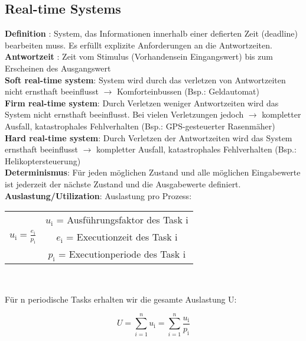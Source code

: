 \subsection{Real-time Systems}
\textbf{Definition} : System, das Informationen innerhalb einer defierten Zeit
(deadline) bearbeiten muss. Es erfüllt explizite Anforderungen an die
Antwortzeiten.\\
\textbf{Antwortzeit} : Zeit vom Stimulus (Vorhandensein
Eingangswert) bis zum Erscheinen des Ausgangswert\\
\textbf{Soft real-time system}: System wird durch das verletzen von
Antwortzeiten nicht ernsthaft beeinflusst $\rightarrow$ Komforteinbussen (Bsp.:
Geldautomat)\\
\textbf{Firm real-time system}: Durch Verletzen weniger Antwortzeiten wird das
System nicht ernsthaft beeinflusst. Bei vielen Verletzungen jedoch $\rightarrow$
kompletter Ausfall, katastrophales Fehlverhalten (Bsp.: GPS-gesteuerter
Rasenmäher)\\
\textbf{Hard real-time system}: Durch Verletzen der Antwortzeiten wird das
System ernsthaft beeinflusst $\rightarrow$ kompletter Ausfall, katastrophales
Fehlverhalten (Bsp.: Helikoptersteuerung)\\
\textbf{Determinismus}: Für jeden möglichen Zustand und alle möglichen
Eingabewerte ist jederzeit der nächste Zustand und die Ausgabewerte definiert.\\
\textbf{Auslastung/Utilization}: 
Auslastung pro Prozess:
\begin{center}  
\begin{tabular}{c c}
& $u_\text{i}$ = Ausführungsfaktor des Task i\\
$u_\text{i} = \frac{e_\text{i}}{p_\text{i}}$&$e_\text{i}$ = Executionzeit des
Task i\\
& $p_\text{i}$ = Executionperiode des Task i
\end{tabular}\\
\end{center}
Für n periodische Tasks erhalten wir die gesamte Auslastung U: 
\begin{center}
\begin{equation}
U = \sum_{i=1}^{n}u_\text{i} = \sum_{i=1}^{n}\frac{u_\text{i}}{p_\text{i}}
\end{equation}
\end{center}

